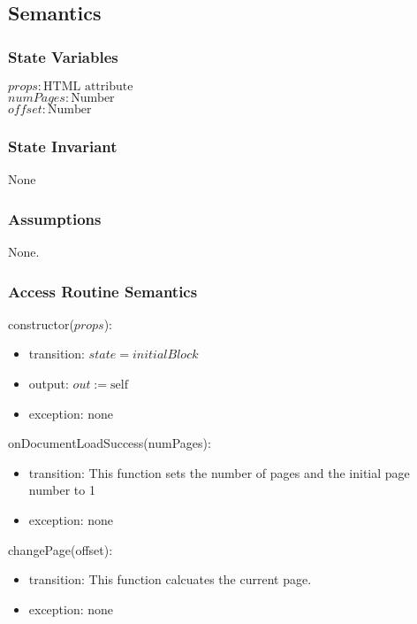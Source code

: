 \documentclass[12pt, titlepage]{article}
\begin{document}
\subsection{Semantics}

\subsubsection{State Variables}

$\mathit{props}: \text{HTML attribute}$\\
$\mathit{numPages}: \text{Number}$\\
$\mathit{offset}: \text{Number}$

\subsubsection{State Invariant}

None

\subsubsection{Assumptions}

None.

\subsubsection{Access Routine Semantics}

\noindent constructor($props$):
\begin{itemize}
\item transition: $\mathit{state} = initialBlock$
\item output: $out := \mbox{self}$
\item exception: none
\end{itemize}

\noindent onDocumentLoadSuccess(numPages):
\begin{itemize}
\item transition: This function sets the number of pages and the initial page number to 1
\item exception: none
\end{itemize}

\noindent changePage(offset):
\begin{itemize}
\item transition: This function calcuates the current page.
\item exception: none
\end{itemize}
\end{document}
